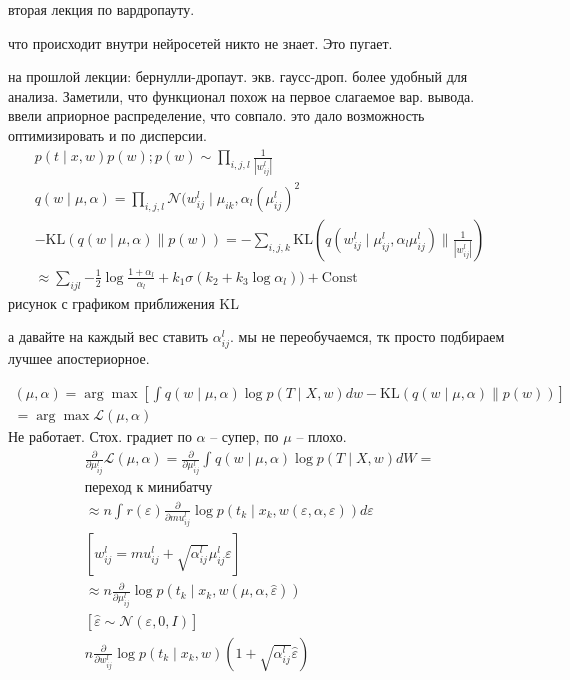 \documentclass{minimal}
\begin{document}
вторая лекция по вардропауту.

что происходит внутри нейросетей никто не знает. Это пугает.

на прошлой лекции: бернулли-дропаут. экв. гаусс-дроп. более удобный для анализа. Заметили, что функционал похож на первое слагаемое вар. вывода. ввели априорное распределение, что совпало. это дало возможность оптимизировать и по дисперсии.
\begin{gather*}
  p(t\mid x, w)p(w); p(w)\sim \prod_{i,j,l}^{} {\frac{1}{|w_{ij}^l|}}\\
  q(w\mid \mu,\alpha)=\prod_{i,j,l}^{} {\mathcal{N}(w_{ij}^l\mid \mu_{ik},\alpha_l(\mu_{ij}^l)^2}\\
  -\mathrm{KL}(q(w\mid\mu,\alpha)\| p(w))=-\sum_{i,j,k}^{} {\mathrm{KL}\left(q(w_{ij}^l\mid \mu _{ij}^l, \alpha_l \mu _{ij}^l)\|\frac{1}{|w_{ij}^l|}\right)} \\
  \approx \sum_{ijl}^{} {-\frac{1}{2}\log\frac{1+\alpha_l}{\alpha_l}+k_1\sigma(k_2+k_3\log\alpha_l))+\mathrm{Const}}
\end{gather*}
рисунок с графиком приближения KL

а давайте на каждый вес ставить $\alpha_{ij}^l$. мы не переобучаемся, тк просто подбираем лучшее апостериорное.

\begin{gather*}
(\mu, \alpha) = \arg\max \left[\int {q(w\mid \mu,\alpha)\log p(T\mid X,w)dw}-\mathrm{KL}(q(w\mid \mu,\alpha)\|p(w))\right]\\
  =\arg\max \mathcal{L}(\mu,\alpha)
\end{gather*}
Не работает. Стох. градиет по $\alpha$ -- супер, по $\mu$ -- плохо.
\begin{gather*}
  \frac{\partial }{\partial \mu_{ij}^l} \mathcal{L}(\mu,\alpha)=\frac{\partial }{\partial \mu_{ij}^l}\int_{}^{} {q(w\mid \mu, \alpha)\log p(T\mid X,w)dW=}\\
  \textrm{переход к минибатчу}\\
  \approx n \int_{}^{} {r(\varepsilon)\frac{\partial }{\partial mu_{ij}^l}\log p(t_k\mid x_k, w(\varepsilon, \alpha, \varepsilon))d\varepsilon}\\
  [w_{ij}^l=mu_{ij}^l+\sqrt{\alpha_{ij}^l}\mu_{ij}^l\varepsilon]\\
  \approx n\frac{\partial }{\partial \mu_{ij}^l}\log p(t_k\mid x_k,w(\mu,\alpha,\hat{\varepsilon}))\\
  [\hat{\varepsilon}\sim \mathcal{N}(\varepsilon,0,I)]\\
  n\frac{\partial }{\partial w_{ij}^l}\log p(t_k\mid x_k,w)\left(1+\sqrt{\alpha_{ij}^l}\hat{\varepsilon}\right)
\end{gather*}
\end{document}
